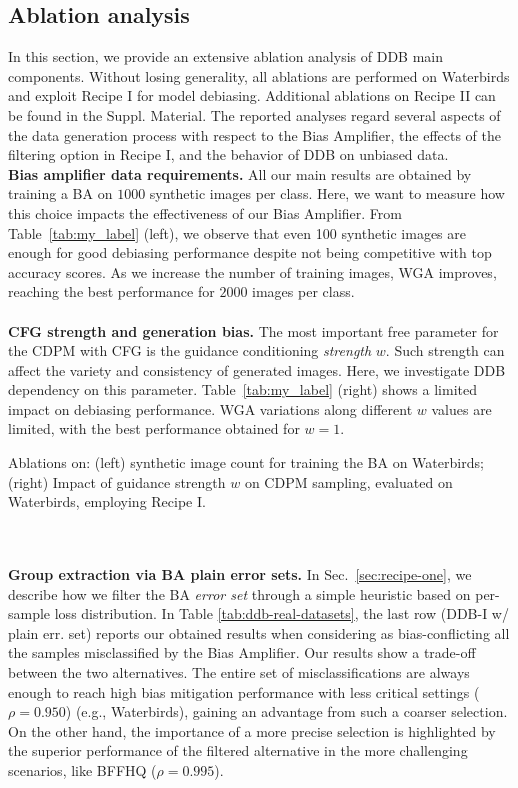 \subsection{Ablation analysis}
In this section, we provide an extensive ablation analysis of DDB main components. Without losing generality, all ablations are performed on Waterbirds and exploit Recipe I for model debiasing. Additional ablations on Recipe II can be found in the Suppl. Material.
The reported analyses regard several aspects of the data generation process with respect to the Bias Amplifier, the effects of the filtering option in Recipe I, and the behavior of DDB on unbiased data.\\ 
\label{sec:ablations}
\noindent \textbf{Bias amplifier data requirements.} 
All our main results are obtained by training a BA on $1000$ synthetic images per class. Here, we want to measure how this choice impacts the effectiveness of our Bias Amplifier. From Table~\ref{tab:my_label} (left), we observe that even 100 synthetic images are enough for good debiasing performance despite not being competitive with top accuracy scores. As we increase the number of training images, WGA improves, reaching the best performance for $2000$ images per class.
\\ 
\\
\noindent \textbf{CFG strength and generation bias.} 
The most important free parameter for the CDPM with CFG is the guidance conditioning \textit{strength} $w$. Such strength can affect the variety and consistency of generated images. Here, we investigate DDB dependency on this parameter. Table~\ref{tab:my_label} (right) shows a limited impact on debiasing performance. WGA variations along different $w$ values are limited, with the best performance obtained for $w=1$.
\begin{table}[!b]    
    \vspace{-4mm}
    \caption{Ablations on: (left) synthetic image count for training the BA on Waterbirds; (right) Impact of guidance strength $w$ on CDPM sampling, evaluated on Waterbirds, employing Recipe I.}
    \label{tab:my_label}
\end{table}
\\
\\ \noindent \textbf{Group extraction via BA plain error sets.}
In Sec.~\ref{sec:recipe-one}, we describe how we filter the BA \textit{error set} through a simple heuristic based on per-sample loss distribution. In Table \ref{tab:ddb-real-datasets}, the last row (DDB-I w/ plain err. set) reports our obtained results when considering as bias-conflicting all the samples misclassified by the Bias Amplifier. Our results show a trade-off between the two alternatives. The entire set of misclassifications are always enough to reach high bias mitigation performance with less critical settings ($\rho = 0.950$) (e.g., Waterbirds), gaining an advantage from such a coarser selection. On the other hand, the importance of a more precise selection is highlighted by the superior performance of the filtered alternative in the more challenging scenarios, like BFFHQ ($\rho=0.995$).\\
